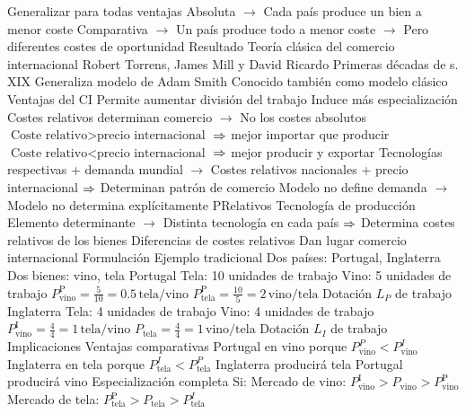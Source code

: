 \documentclass{nuevotema}
\begin{document}
\begin{esquemal}
				\4 Generalizar para todas ventajas
				\4[] Absoluta
				\4[] $\to$ Cada país produce un bien a menor coste
				\4[] Comparativa
				\4[] $\to$ Un país produce todo a menor coste
				\4[] $\to$ Pero diferentes costes de oportunidad
			\3 Resultado
				\4 Teoría clásica del comercio internacional
				\4[] Robert Torrens, James Mill y David Ricardo
				\4[] Primeras décadas de s. XIX
				\4[] Generaliza modelo de Adam Smith
				\4[] Conocido también como modelo clásico
				\4 Ventajas del CI
				\4[] Permite aumentar división del trabajo
				\4[] Induce más especialización
				\4 Costes relativos determinan comercio
				\4[] $\to$ No los costes absolutos
				\4[] $\text{Coste relativo} > \text{precio internacional}$
				\4[] $\then$ mejor importar que producir
				\4[] $\text{Coste relativo} < \text{precio internacional}$
				\4[] $\then$ mejor producir y exportar
				\4[] Tecnologías respectivas + demanda mundial
				\4[] $\to$ Costes relativos nacionales + precio internacional
				\4[] $\then$ Determinan patrón de comercio
				\4 Modelo no define demanda
				\4[] $\to$ Modelo no determina explícitamente PRelativos
				\4 Tecnología de producción
				\4[] Elemento determinante
				\4[] $\to$ Distinta tecnología en cada país
				\4[] $\then$ Determina costes relativos de los bienes
				\4 Diferencias de costes relativos
				\4[$\Rightarrow$] Dan lugar comercio internacional
		\2 Formulación
			\3 Ejemplo tradicional
				\4 Dos países: Portugal, Inglaterra
				\4 Dos bienes: vino, tela
			\3 Portugal
				\4 Tela: 10 unidades de trabajo
				\4 Vino: 5  unidades de trabajo
				\4 $P_\textrm{vino}^\textrm{P} = \frac{5}{10}= 0.5 \, \textrm{tela} / \textrm{vino}$
				\4 $P_\textrm{tela}^\text{P} = \frac{10}{5} = 2 \, \textrm{vino} / \textrm{tela}$
				\4 Dotación $L_P$ de trabajo
			\3 Inglaterra
				\4 Tela: 4 unidades de trabajo
				\4 Vino: 4 unidades de trabajo
				\4 $P_\textrm{vino}^\textrm{I} = \frac{4}{4}= 1 \, \textrm{tela} / \textrm{vino}$
				\4 $P_\textrm{tela} = \frac{4}{4} = 1 \, \textrm{vino} / \textrm{tela}$
				\4 Dotación $L_I$ de trabajo
		\2 Implicaciones
			\3 Ventajas comparativas
				\4 Portugal en vino porque $P_\textrm{vino}^P < P_\textrm{vino}^I$
				\4 Inglaterra en tela porque $P_\textrm{tela}^I < P_\textrm{tela}^P$
				\4[$\then$] Inglaterra producirá tela
				\4[$\then$] Portugal producirá vino
			\3 Especialización completa
				\4 Si:
				\4[] Mercado de vino: $P_\textrm{vino}^\textrm{I} > P_\textrm{vino} > P_\textrm{vino}^\textrm{P}$ \4[] Mercado de tela: $P_\textrm{tela}^\textrm{P} > P_\textrm{tela} > P_\textrm{tela}^I$

\end{esquemal}
\end{document}
